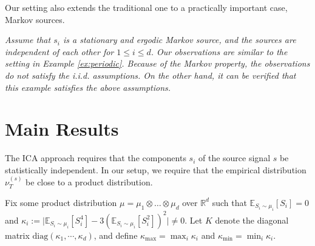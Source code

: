 \documentclass[twoside,11pt]{article}
\newcommand{\E}{\mathbb{E}}
\newcommand{\real}{\mathbb{R}}
\newcommand{\R}{\real}
\begin{document}
Our setting also extends the traditional one to a practically important case, Markov sources.  
\begin{example} \em
\label{ex:markov}
Assume that $s_i$ is a stationary and ergodic Markov source, and the sources are independent of each other for $1\le i\le d$. Our observations are similar to the setting in Example \ref{ex:periodic}. 
Because of the Markov property, the observations do not satisfy the i.i.d. assumptions. On the other hand, it can be verified that this example satisfies the above assumptions.
\end{example}


\section{Main Results}
\label{sec:main}

The ICA approach requires that the components $s_i$ of the source signal $s$ be statistically independent. In our setup, we require that the empirical distribution $\nu_T^{(s)}$ be close to a product distribution.

Fix some product distribution $\mu= \mu_1\otimes \ldots \otimes \mu_d$ over $\R^d$ 
such that $\E_{S_i\sim\mu_i}[S_i]=0$ and $\kappa_i := \vert \E_{S_i\sim \mu_i}[S_i^4] - 3\left(\E_{S_i\sim \mu_i}[S_i^2]\right)^2 \vert \neq 0$. Let
$K$ denote the diagonal matrix $\text{diag}(\kappa_1,\cdots,\kappa_d)$, and define $\kappa_{\max}=\max_{i} \kappa_i$ and $\kappa_{\min}=\min_{i} \kappa_i$.
\end{document}
